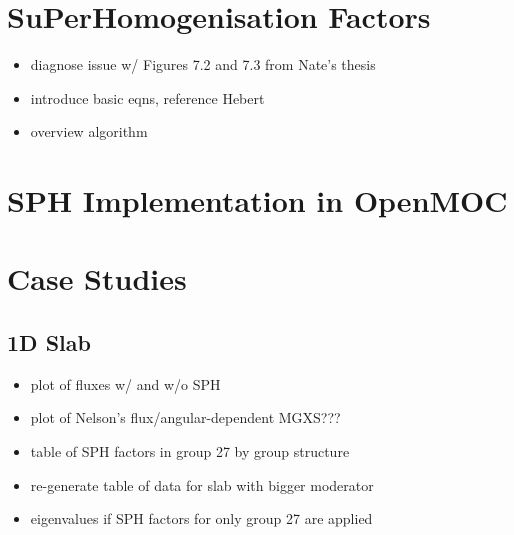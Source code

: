\cite{hebert1993consistent}


\section{SuPerHomogenisation Factors}
\label{sec:chap5-sph}

\begin{itemize}
  \item diagnose issue w/ Figures 7.2 and 7.3 from Nate's thesis
  \item introduce basic eqns, reference Hebert
  \item overview algorithm
\end{itemize}


\section{SPH Implementation in OpenMOC}
\label{sec:chap5-sph-openmoc}




\section{Case Studies}
\label{sec:chap5-sph-results}

\subsection{1D Slab}
\label{subsubsec:chap5-sph-slab}

\begin{itemize}[noitemsep]
  \item plot of fluxes w/ and w/o SPH
  \item plot of Nelson's flux/angular-dependent MGXS???
  \item table of SPH factors in group 27 by group structure
  \item re-generate table of data for slab with bigger moderator
  \item eigenvalues if SPH factors for only group 27 are applied
\end{itemize}

